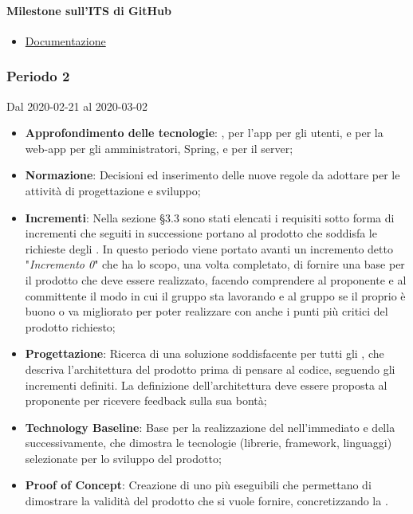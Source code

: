 \paragraph{Milestone sull'ITS di GitHub}
\begin{itemize}
	\item \href{https://github.com/qb-team/Stalker-Documentazione/milestone/8}{Documentazione}
\end{itemize}

\subsubsection{Periodo 2} 
Dal 2020-02-21 al 2020-03-02
\begin{itemize}
	\item \textbf{Approfondimento delle tecnologie}: ,  per l'app per gli utenti,  e  per la web-app per gli amministratori, Spring,  e  per il server;
	\item \textbf{Normazione}: Decisioni ed inserimento delle nuove regole da adottare per le attività di progettazione e sviluppo;
	\item \textbf{Incrementi}: Nella sezione §3.3 sono stati elencati i requisiti sotto forma di incrementi che seguiti in successione portano al prodotto che soddisfa le richieste degli .
	In questo periodo viene portato avanti un incremento detto "\textit{Incremento 0}" che ha lo scopo, una volta completato, di fornire una base per il prodotto che deve essere realizzato, facendo comprendere al proponente e al committente
	il modo in cui il gruppo sta lavorando e al gruppo se il proprio  è buono o va migliorato per poter realizzare con  anche i punti più critici del prodotto richiesto;
	\item \textbf{Progettazione}: Ricerca di una soluzione soddisfacente per tutti gli , che descriva l'architettura del prodotto prima di pensare al codice, seguendo gli incrementi definiti.
	La definizione dell'architettura deve essere proposta al proponente per ricevere feedback sulla sua bontà;
	\item \textbf{Technology Baseline}: Base per la realizzazione del  nell'immediato e della  successivamente, che dimostra le tecnologie (librerie, framework, linguaggi) selezionate per lo sviluppo del prodotto;
	\item \textbf{Proof of Concept}: Creazione di uno più eseguibili che permettano di dimostrare la validità del prodotto che si vuole fornire, concretizzando la .

\end{itemize}
